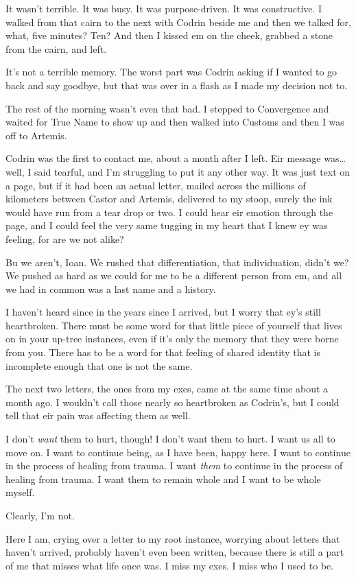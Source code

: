 It wasn't terrible. It was busy. It was purpose-driven. It was constructive. I walked from that cairn to the next with Codrin beside me and then we talked for, what, five minutes? Ten? And then I kissed em on the cheek, grabbed a stone from the cairn, and left.

It's not a terrible memory. The worst part was Codrin asking if I wanted to go back and say goodbye, but that was over in a flash as I made my decision not to.

The rest of the morning wasn't even that bad. I stepped to Convergence and waited for True Name to show up and then walked into Customs and then I was off to Artemis.

Codrin was the first to contact me, about a month after I left. Eir message was\ldots well, I said tearful, and I'm struggling to put it any other way. It was just text on a page, but if it had been an actual letter, mailed across the millions of kilometers between Castor and Artemis, delivered to my stoop, surely the ink would have run from a tear drop or two. I could hear eir emotion through the page, and I could feel the very same tugging in my heart that I knew ey was feeling, for are we not alike?

Bu we aren't, Ioan. We rushed that differentiation, that individuation, didn't we? We pushed as hard as we could for me to be a different person from em, and all we had in common was a last name and a history.

I haven't heard since in the years since I arrived, but I worry that ey's still heartbroken. There must be some word for that little piece of yourself that lives on in your up-tree instances, even if it's only the memory that they were borne from you. There has to be a word for that feeling of shared identity that is incomplete enough that one is not the same.

The next two letters, the ones from my exes, came at the same time about a month ago. I wouldn't call those nearly so heartbroken as Codrin's, but I could tell that eir pain was affecting them as well.

I don't \emph{want} them to hurt, though! I don't want them to hurt. I want us all to move on. I want to continue being, as I have been, happy here. I want to continue in the process of healing from trauma. I want \emph{them} to continue in the process of healing from trauma. I want them to remain whole and I want to be whole myself.

Clearly, I'm not.

Here I am, crying over a letter to my root instance, worrying about letters that haven't arrived, probably haven't even been written, because there is still a part of me that misses what life once was. I miss my exes. I miss who I used to be.

